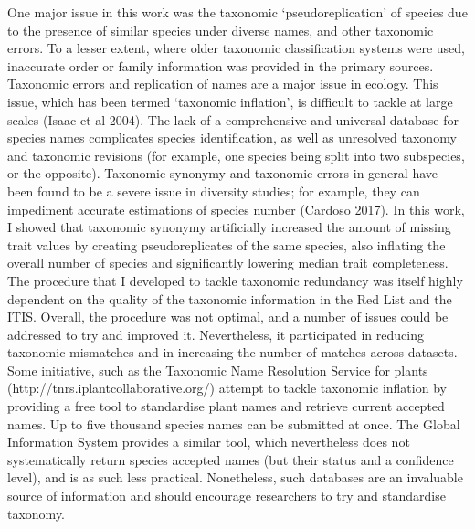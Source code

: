 One major issue in this work was the taxonomic `pseudoreplication' of species due to the presence of similar species under diverse names, and other taxonomic errors. To a lesser extent, where older taxonomic classification systems were used, inaccurate order or family information was provided in the primary sources. Taxonomic errors and replication of names are a major issue in ecology. This issue, which has been termed `taxonomic inflation', is difficult to tackle at large scales (Isaac et al 2004). The lack of a comprehensive and universal database for species names complicates species identification, as well as unresolved taxonomy and taxonomic revisions (for example, one species being split into two subspecies, or the opposite).
Taxonomic synonymy and taxonomic errors in general have been found to be a severe issue in diversity studies; for example, they can impediment accurate estimations of species number (Cardoso 2017). In this work, I showed that taxonomic synonymy artificially increased the amount of missing trait values by creating pseudoreplicates of the same species, also inflating the overall number of species and significantly lowering median trait completeness. The procedure that I developed to tackle taxonomic redundancy was itself highly dependent on the quality of the taxonomic information in the Red List and the ITIS. Overall, the procedure was not optimal, and a number of issues could be addressed to try and improved it. Nevertheless, it participated in reducing taxonomic mismatches and in increasing the number of matches across datasets. Some initiative, such as the Taxonomic Name Resolution Service for plants (http://tnrs.iplantcollaborative.org/) attempt to tackle taxonomic inflation by providing a free tool to standardise plant names and retrieve current accepted names. Up to five thousand species names can be submitted at once. The Global Information System provides a similar tool, which nevertheless does not systematically return species accepted names (but their status and a confidence level), and is as such less practical. Nonetheless, such databases are an invaluable source of information and should encourage researchers to try and standardise taxonomy.


